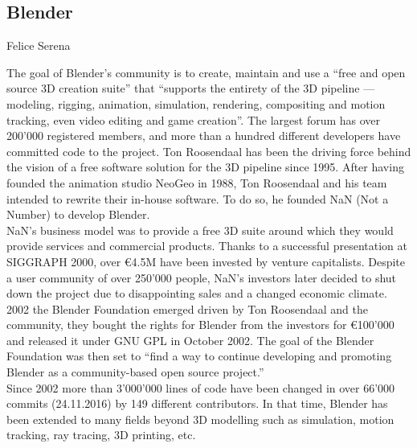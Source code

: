 \subsection{Blender}{Felice Serena}

The goal of Blender's community is to create, maintain and use a ``free and open source 3D creation suite'' that ``supports the entirety of the 3D pipeline — modeling, rigging, animation, simulation, rendering, compositing and motion tracking, even video editing and game creation''. The largest forum\cite{blender-forum} has over 200'000 registered members, and more than a hundred different developers have committed code to the project. Ton Roosendaal has been the driving force behind the vision of a free software solution for the 3D pipeline since 1995. After having founded the animation studio NeoGeo in 1988\cite{blender-manual-history}, Ton Roosendaal and his team intended to rewrite their in-house software. To do so, he founded NaN (Not a Number) to develop Blender. \\

NaN's business model was to provide a free 3D suite around which they would provide services and commercial products. Thanks to a successful presentation at SIGGRAPH 2000, over €4.5M have been invested by venture capitalists. Despite a user community of over 250'000 people, NaN's investors later decided to shut down the project due to disappointing sales and a changed economic climate. 2002 the Blender Foundation emerged driven by Ton Roosendaal and the community, they bought the rights for Blender from the investors for €100'000 and released it under GNU GPL\cite{blender-license} in October 2002. The goal of the Blender Foundation was then set to ``find a way to continue developing and promoting Blender as a community-based open source project.'' \cite{blender-official-history} \\

Since 2002 more than 3'000'000 lines of code have been changed in over 66'000 commits (24.11.2016) by 149 different contributors. In that time, Blender has been extended to many fields beyond 3D modelling such as simulation, motion tracking, ray tracing, 3D printing, etc. \\

